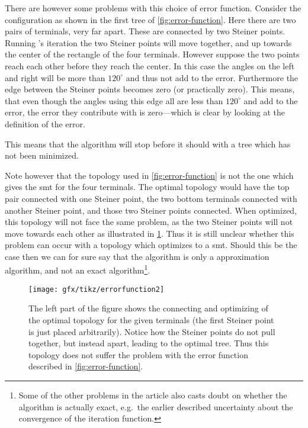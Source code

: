 There are however some problems with this choice of error function. Consider the
configuration as shown in the first tree of \cref{fig:error-function}. Here
there are two pairs of terminals, very far apart. These are connected by two
Steiner points. Running \citeauthor{smith1992}'s iteration the two
Steiner points will move together, and up towards the center of the rectangle of
the four terminals. However suppose the two points reach each other before they
reach the center. In this case the angles on the left and right will be more
than $120^{\circ}$ and thus not add to the error. Furthermore the edge between
the Steiner points becomes zero (or practically zero). This means, that even
though the angles using this edge all are less than $120^{\circ}$ and add to the
error, the error they contribute with is zero---which is clear by looking at the
definition of the error.

This means that the algorithm will stop before it should with a tree which has
not been minimized.

Note however that the topology used in \cref{fig:error-function} is not the one
which gives the \ac{smt} for the four terminals. The optimal topology would have
the top pair connected with one Steiner point, the two bottom terminals
connected with another Steiner point, and those two Steiner points
connected. When optimized, this topology will not face the same problem, as the
two Steiner points will not move towards each other as illustrated in
\cref{fig:error-function2}. Thus it is still unclear whether this problem can
occur with a topology which optimizes to a \ac{smt}.  Should this be the case
then we can for sure say that the algorithm is only a approximation algorithm,
and not an exact algorithm\footnote{Some of the other problems in the article
  also casts doubt on whether the algorithm is actually exact, e.g.\ the earlier
  described uncertainty about the convergence of the iteration function.}.

\begin{figure}[htbp]
  \centering
  \texttt{[image: gfx/tikz/errorfunction2]}
  \caption[Possible problem with the error function, part 2]{The left part of the figure
    shows the connecting and optimizing of the optimal topology for the given
    terminals (the first Steiner point is just placed arbitrarily). Notice how
    the Steiner points do not pull together, but instead apart, leading to the
    optimal tree. Thus this topology does not suffer the problem with the error
    function described in \cref{fig:error-function}.\label{fig:error-function2}}
\end{figure}

